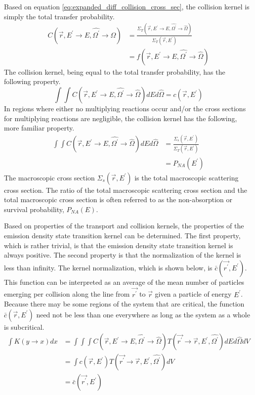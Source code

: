 Based on equation \ref{eq:expanded_diff_collision_cross_sec}, the collision 
kernel is simply the total transfer probability.  
\begin{align}
  C(\vec{r},E^{'} \to E, \hat{\Omega^{'}} \to \hat{\Omega}) & =
  \frac{\Sigma_T(\vec{r},E^{'} \to E,\hat{\Omega^{'}} \to \hat{\Omega})}
       {\Sigma_T(\vec{r},E^{'})} \nonumber \\
  & = f(\vec{r},E^{'} \to E,\hat{\Omega^{'}} \to \hat{\Omega})
\end{align}
The collision kernel, being equal to the total transfer probability, has the 
following property. 
\begin{equation}
  \int\int C(\vec{r},E^{'} \to E,\hat{\Omega^{'}} \to \hat{\Omega}) 
  dEd\hat{\Omega} = c(\vec{r},E^{'})
  \label{eq:collision_op_prop_gen}
\end{equation}
In regions where either no multiplying reactions occur and/or the cross sections
for multiplying reactions are negligible, the collision kernel has the 
following, more familiar property.
\begin{align}
  \int\int C(\vec{r},E^{'} \to E,\hat{\Omega^{'}} \to \hat{\Omega}) 
  dEd\hat{\Omega} & = \frac{\Sigma_s(\vec{r},E^{'})}{\Sigma_T(\vec{r},E^{'})}
  \label{eq:collision_op_prop} \\
  & = P_{NA}(E^{'}) \nonumber 
\end{align}
The macroscopic cross section $\Sigma_s(\vec{r},E^{'})$ is the total macroscopic
scattering cross section. The ratio of the total macroscopic scattering cross
section and the total macroscopic cross section is often referred to as the 
non-absorption or survival probability, $P_{NA}(E)$. 

Based on properties of the transport and collision kernels, the properties of 
the emission density state transition kernel can be determined. The first
property, which is rather trivial, is that the emission density state 
transition kernel is always positive. The second property is that the 
normalization of the kernel is less than infinity. The kernel normalization, 
which is shown below, is $\bar{c}(\vec{r^{'}},E^{'})$. This function can be 
interpreted as an average of the mean number of particles emerging per 
collision along the line from $\vec{r^{'}}$ to $\vec{r}$ given a particle of 
energy $E^{'}$. Because there may be some regions of the system that are 
critical, the function $\bar{c}(\vec{r},E^{'})$ need not be less than one 
everywhere as long as the system as a whole is subcritical.
\begin{align}
  \int K(y \to x) dx & = \int\int\int 
  C(\vec{r},E^{'} \to E,\hat{\Omega^{'}} \to \hat{\Omega})
  T(\vec{r^{'}} \to \vec{r},E^{'},\hat{\Omega^{'}}) dE d\hat{\Omega} dV 
  \nonumber \\
  & = \int c(\vec{r},E^{'}) T(\vec{r^{'}} \to \vec{r},E^{'},\hat{\Omega^{'}})
  dV \nonumber \\
  & = \bar{c}(\vec{r^{'}},E^{'})
\end{align}

